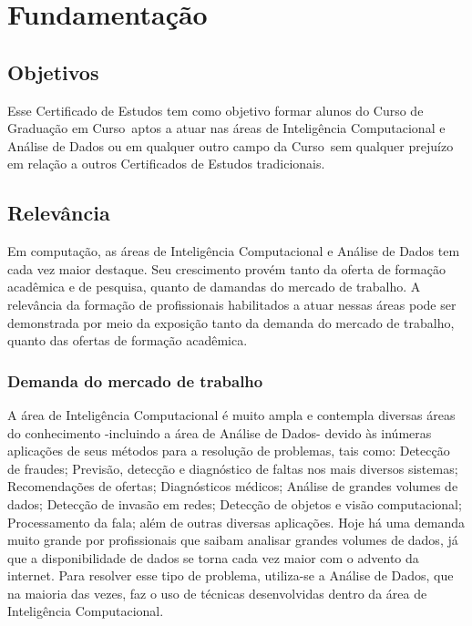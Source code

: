 \documentclass{article}
\newcommand{\curso}{Curso} %
\begin{document}
	\section{Fundamentação} \label{sec:Fund}
	
	\subsection{Objetivos}
	Esse Certificado de Estudos tem como objetivo formar alunos do Curso de Graduação em \curso \ aptos a atuar nas áreas de Inteligência Computacional e Análise de Dados ou em qualquer outro campo da \curso \ sem qualquer prejuízo em relação a outros Certificados de Estudos tradicionais.
	
	\subsection{Relevância}
	Em computação, as áreas de Inteligência Computacional e Análise de Dados tem cada vez maior destaque. Seu crescimento provém tanto da oferta de formação acadêmica e de pesquisa, quanto de damandas do mercado de trabalho. A relevância da formação de profissionais habilitados a atuar nessas áreas pode ser demonstrada por meio da exposição tanto da demanda do mercado de trabalho, quanto das ofertas de formação acadêmica. 
	
	\subsubsection{Demanda do mercado de trabalho}
	A área de Inteligência Computacional é muito ampla e contempla diversas áreas do conhecimento -incluindo a área de Análise de Dados- devido às inúmeras aplicações de seus métodos para a resolução de problemas, tais como: Detecção de fraudes; Previsão, detecção e diagnóstico de faltas nos mais diversos sistemas; Recomendações de ofertas; Diagnósticos médicos; Análise de grandes volumes de dados; Detecção de invasão em redes; Detecção de objetos e visão computacional; Processamento da fala;  além de outras diversas aplicações. Hoje há uma demanda muito grande por profissionais que saibam analisar grandes volumes de dados, já que a disponibilidade de dados se torna cada vez maior com o advento da internet. Para resolver esse tipo de problema, utiliza-se a Análise de Dados, que na maioria das vezes, faz o uso de técnicas desenvolvidas dentro da área de Inteligência Computacional.
	
\end{document}
